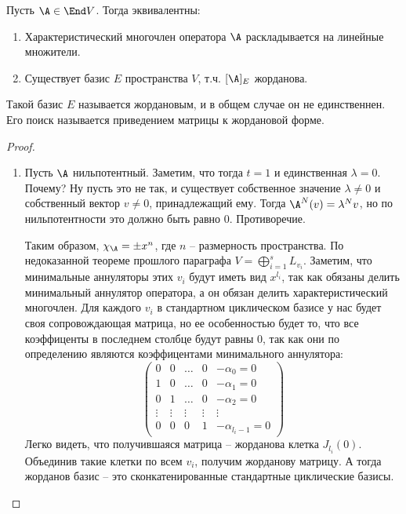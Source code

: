 \begin{theorem-non}
    Пусть $\A \in \End V$. Тогда эквивалентны: \begin{enumerate}
        \item Характеристический многочлен оператора $\A$ раскладывается на линейные множители.
        \item Существует базис $E$ пространства $V$, т.ч. $[\A]_E$ жорданова. 
    \end{enumerate}
    Такой базис $E$ называется жордановым, и в общем случае он не единственнен. 
    Его поиск называется приведением матрицы к жордановой форме.
\end{theorem-non}
\begin{proof} \quad 

    \begin{enumerate}
        \item Пусть $\A$ нильпотентный.
        Заметим, что тогда $t = 1$ и единственная $\lambda = 0$.
        Почему? Ну пусть это не так, и существует собственное значение $\lambda \neq 0$ и собственный вектор $v \neq 0$, принадлежащий ему.
        Тогда $\A^N(v) = \lambda^N v$, но по нильпотентности это должно быть равно 0. Противоречие.
    
        Таким образом, $\chi_{\A} = \pm x^n$, где $n$ -- размерность пространства.
        По недоказанной теореме прошлого параграфа $V = \bigoplus\limits_{i=1}^s L_{v_i}$.
        Заметим, что минимальные аннуляторы этих $v_i$ будут иметь вид $x^{l_i}$, так как обязаны делить минимальный аннулятор оператора, а он обязан делить характеристический многочлен.
        Для каждого $v_i$ в стандартном циклическом базисе у нас будет своя сопровождающая матрица, но ее особенностью будет то, что все коэффиценты в последнем столбце будут равны 0, так как они по определению являются коэффицентами минимального аннулятора:
        \[
            \left(\begin{array}{ccccc}
            0 & 0 & \dots & 0 & -\alpha_0 = 0 \\ 
            1 & 0 & \dots & 0 & -\alpha_1 = 0 \\ 
            0 & 1 & \dots & 0 & -\alpha_2 = 0 \\ 
            \vdots & \vdots & \vdots & \vdots & \vdots \\ 
            0 & 0 & 0 & 1 & -\alpha_{l_i - 1} = 0
        \end{array}\right)    
        \]
        Легко видеть, что получившаяся матрица -- жорданова клетка $J_{l_i}(0)$. 
        Объединив такие клетки по всем $v_i$, получим жорданову матрицу. 
        А тогда жорданов базис -- это сконкатенированные стандартные циклические базисы.


\end{enumerate}
\end{proof}
